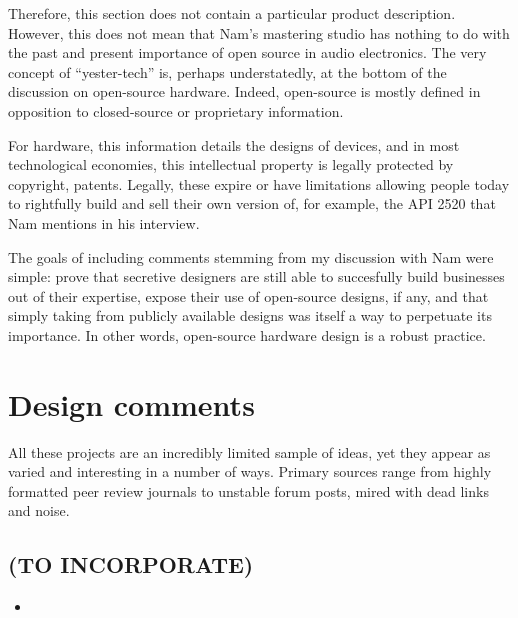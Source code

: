 Therefore, this section does not contain a particular product description. However, this does not mean that Nam's mastering studio has nothing to do with the past and present importance of open source in audio electronics. The very concept of ``yester-tech'' is, perhaps understatedly, at the bottom of the discussion on open-source hardware. Indeed, open-source is mostly defined in opposition to closed-source or proprietary information.

For hardware, this information details the designs of devices, and in most technological economies, this intellectual property is legally protected by copyright, patents. Legally, these expire or have limitations allowing people today to rightfully build and sell their own version of, for example, the API 2520 that Nam mentions in his interview. 

The goals of including comments stemming from my discussion with Nam were simple: prove that secretive designers are still able to succesfully build businesses out of their expertise, expose their use of open-source designs, if any, and that simply taking from publicly available designs was itself a way to perpetuate its importance. In other words, open-source hardware design is a robust practice. 

\section{Design comments}

All these projects are an incredibly limited sample of ideas, yet they appear as varied and interesting in a number of ways. Primary sources range from highly formatted peer review journals to unstable forum posts, mired with dead links and noise.  



\begin{unsortedStuff}	
\section*{(TO INCORPORATE)}
	\begin{itemize}
		\item 
	\end{itemize}
\end{unsortedStuff}
		
\begin{optBlankSpace}
	\newpage
	\mbox{}
\end{optBlankSpace}


